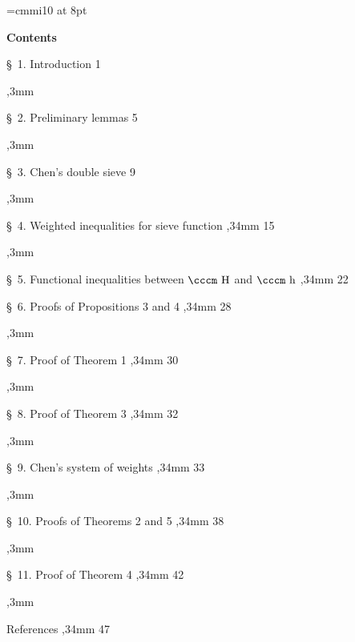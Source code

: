 {\hsize 122mm
\baselineskip=4mm
\overfullrule =0pt
\leftskip=22mm
\font\cccm=cmmi10 at 8pt

\def\cccmh{\hbox{\cccm h}}
\def\cccmH{\hbox{\cccm H}}


\hskip 36mm{\bf Contents}

\vskip 5mm

\ninerm
\S\ 1. Introduction
\dotfill \hskip 6mm 1

,3mm

\S\ 2. Preliminary lemmas
\dotfill \hskip 6mm 5

,3mm

\S\ 3. Chen's double sieve
\dotfill \hskip 6mm 9

,3mm

\S\ 4. Weighted inequalities for sieve function
\dotfill {},34mm 15

,3mm

\S\ 5. Functional inequalities between $\cccmH$ and $\cccmh$
\dotfill {},34mm 22

\S\ 6. Proofs of Propositions 3 and 4
\dotfill {},34mm 28

,3mm

\S\ 7. Proof of Theorem 1
\dotfill {},34mm 30

,3mm

\S\ 8. Proof of Theorem 3
\dotfill {},34mm 32

,3mm

\S\ 9. Chen's system of weights
\dotfill {},34mm 33

,3mm

\S\ 10. Proofs of Theorems 2 and 5
\dotfill {},34mm 38

,3mm

\S\ 11. Proof of Theorem 4
\dotfill {},34mm 42

,3mm

References
\dotfill {},34mm 47
\par}



\vskip 10mm


\medskip

